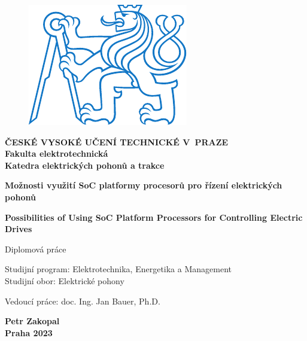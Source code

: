 \documentclass[a4paper, twoside, 11pt]{article}
\begin{document}
\setcounter{figure}{0}

\begin{titlepage}
	\begin{center}

\begin{figure}[H]
	\begin{center}
		\includegraphics[scale=1]{src/misc/symbol_cvut_konturova_verze.pdf}
	\end{center}
\end{figure}
	{\Large{\textbf{ČESKÉ VYSOKÉ UČENÍ TECHNICKÉ V~PRAZE}}}\\
	{\textbf{Fakulta elektrotechnická}}\\
	{\textbf{Katedra elektrických pohonů a trakce}}
	
	\vspace{3cm}
	
	
	{\Large\textbf{Možnosti využití SoC platformy procesorů pro řízení elektrických pohonů}}
	
	\vspace{1cm}
	
	{\Large\textbf{Possibilities of Using SoC Platform Processors for Controlling Electric Drives}}
	
	\vspace{2cm}
	
	Diplomová práce\\
	
	\end{center}
	
	\vspace{3cm}
	
	\noindent Studijní program: Elektrotechnika, Energetika a Management\\
	\noindent Studijní obor: Elektrické pohony
	
	\vspace{0.5cm}
	\noindent Vedoucí práce: doc. Ing. Jan Bauer, Ph.D.
	
	\vfill
	
\begin{center}

	\large{\textbf{Petr Zakopal}}\\
	\large{\textbf{Praha 2023}}
	\end{center}
\end{titlepage}
\end{document}
